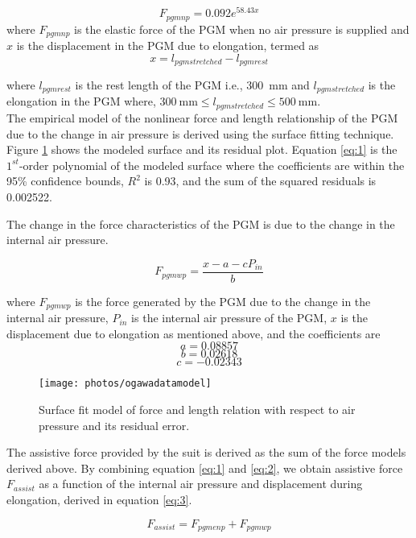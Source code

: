 \documentclass[paper,JRM,paper]{jaciiiarticle}
\begin{document}
\begin{equation}\label{eq:1}
F_{pgmnp} = 0.092e^{58.43x}
\end{equation}
where
$F_{pgmnp}$ is the elastic force of the PGM when no air pressure is supplied and $x$ is the displacement in the PGM due to elongation, termed as
\[x = l_{pgmstretched} - l_{pgmrest} \] 

where $l_{pgmrest}$ is the rest length of the PGM i.e., \SI{300}{\milli\meter} and $l_{pgmstretched}$ is the elongation in the PGM where, $\SI{300}{\milli\meter} \leq l_{pgmstretched} \leq \SI{500}{\milli\meter}$.\\

The empirical model of the nonlinear force and length relationship of the PGM due to the change in air pressure is derived using the surface fitting technique. Figure \ref{fig:ogawamodel} shows the modeled surface and its residual plot. Equation \ref{eq:1} is the $1^{st}$-order polynomial of the modeled surface where the coefficients are within the 95\% confidence bounds, $R^{2}$ is 0.93, and the sum of the squared residuals is 0.002522.

The change in the force characteristics of the PGM is due to the change in the internal air pressure. 

\begin{equation}\label{eq:2}
F_{pgmwp} =  \dfrac{x - a - cP_{in}}{b}
\end{equation}

where $F_{pgmwp}$ is the force generated by the PGM due to the change in the internal air pressure, $P_{in}$ is the internal air pressure of the PGM, $x$ is the displacement due to elongation as mentioned above, and the coefficients are
\[a = 0.08857\]
\[b= 0.02618\]
\[c=-0.02343\]

\begin{figure}[h]
	\centering
	\texttt{[image: photos/ogawadatamodel]}
	\caption{Surface fit model of force and length relation with respect to air pressure and its residual error.}
	\label{fig:ogawamodel}
\end{figure}

The assistive force provided by the suit is derived as the sum of the force models derived above. By combining equation \ref{eq:1} and \ref{eq:2}, we obtain assistive force $F_{assist}$ as a function of the internal air pressure and displacement during elongation, derived in equation \ref{eq:3}.

\[F_{assist} = F_{pgmenp} + F_{pgmwp}\]
\end{document}
